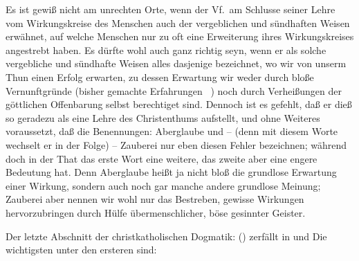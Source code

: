 Es ist gewiß nicht am unrechten Orte, wenn der Vf.\ am Schlusse seiner Lehre vom Wirkungskreise des Menschen auch der vergeblichen und sündhaften Weisen erwähnet, auf welche Menschen nur zu oft eine Erweiterung ihres Wirkungskreises angestrebt haben. Es dürfte wohl auch ganz richtig seyn, wenn er als solche vergebliche und sündhafte Weisen alles dasjenige bezeichnet, wo wir von unserm Thun einen Erfolg erwarten, zu dessen Erwartung wir weder durch bloße Vernunftgründe (bisher gemachte Erfahrungen \udgl\ ) noch durch Verheißungen der göttlichen Offenbarung selbst berechtiget sind. Dennoch ist es gefehlt, daß er dieß so geradezu als eine Lehre des Christenthums aufstellt, und ohne Weiteres voraussetzt, daß die Benennungen: Aberglaube und -- (denn mit diesem Worte wechselt er in der Folge) -- Zauberei nur eben diesen Fehler bezeichnen; während doch in der That das erste Wort eine weitere, das zweite aber eine engere Bedeutung hat. Denn Aberglaube heißt ja nicht bloß die grundlose Erwartung einer Wirkung, sondern auch noch gar manche andere grundlose Meinung; Zauberei aber nennen wir wohl nur das Bestreben, gewisse Wirkungen hervorzubringen durch Hülfe übermenschlicher, böse gesinnter Geister. \par
\gliederungslinie\par
Der letzte Abschnitt der christkatholischen Dogmatik:  () zerfällt in  und  Die wichtigsten unter den ersteren sind: \par
